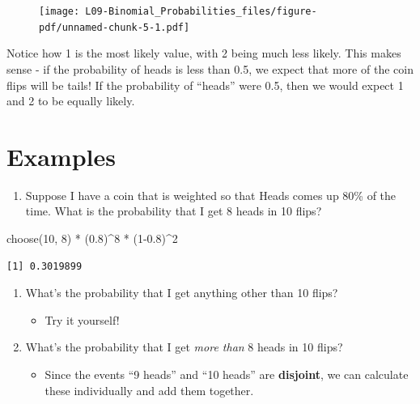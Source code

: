 \documentclass[
  letterpaper,
  DIV=11,
  numbers=noendperiod]{scrreprt}
\newenvironment{Shaded}{\begin{snugshade}}{\end{snugshade}}
\newcommand{\DecValTok}[1]{\textcolor[rgb]{0.68,0.00,0.00}{#1}}
\newcommand{\FloatTok}[1]{\textcolor[rgb]{0.68,0.00,0.00}{#1}}
\newcommand{\FunctionTok}[1]{\textcolor[rgb]{0.28,0.35,0.67}{#1}}
\newcommand{\NormalTok}[1]{\textcolor[rgb]{0.00,0.23,0.31}{#1}}
\newcommand{\SpecialCharTok}[1]{\textcolor[rgb]{0.37,0.37,0.37}{#1}}
\providecommand{\tightlist}{%
  \setlength{\itemsep}{0pt}\setlength{\parskip}{0pt}}\usepackage{longtable,booktabs,array}
\begin{document}
\begin{figure}[H]

{\centering \texttt{[image: L09-Binomial\_Probabilities\_files/figure-pdf/unnamed-chunk-5-1.pdf]}

}

\end{figure}

Notice how 1 is the most likely value, with 2 being much less likely.
This makes sense - if the probability of heads is less than 0.5, we
expect that more of the coin flips will be tails! If the probability of
``heads'' were 0.5, then we would expect 1 and 2 to be equally likely.

\hypertarget{examples-2}{%
\section{Examples}\label{examples-2}}

\begin{enumerate}
\def\labelenumi{\arabic{enumi}.}
\tightlist
\item
  Suppose I have a coin that is weighted so that Heads comes up 80\% of
  the time. What is the probability that I get 8 heads in 10 flips?
\end{enumerate}

\begin{Shaded}
\begin{Highlighting}[]
\FunctionTok{choose}\NormalTok{(}\DecValTok{10}\NormalTok{, }\DecValTok{8}\NormalTok{) }\SpecialCharTok{*}\NormalTok{ (}\FloatTok{0.8}\NormalTok{)}\SpecialCharTok{\^{}}\DecValTok{8} \SpecialCharTok{*}\NormalTok{ (}\DecValTok{1}\FloatTok{{-}0.8}\NormalTok{)}\SpecialCharTok{\^{}}\DecValTok{2}
\end{Highlighting}
\end{Shaded}

\begin{verbatim}
[1] 0.3019899
\end{verbatim}

\begin{enumerate}
\def\labelenumi{\arabic{enumi}.}
\setcounter{enumi}{1}
\tightlist
\item
  What's the probability that I get anything other than 10 flips?

  \begin{itemize}
  \tightlist
  \item
    Try it yourself!
  \end{itemize}
\item
  What's the probability that I get \emph{more than} 8 heads in 10
  flips?

  \begin{itemize}
  \tightlist
  \item
    Since the events ``9 heads'' and ``10 heads'' are \textbf{disjoint},
    we can calculate these individually and add them together.
  \end{itemize}
\end{enumerate}
\end{document}

